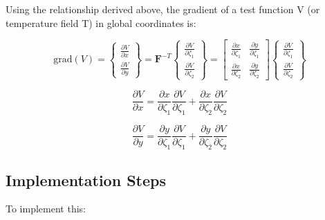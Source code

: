 \documentclass[
  11pt,
  a4paper,
]{scrbook}
\begin{document}
Using the relationship derived above, the gradient of a test function V
(or temperature field T) in global coordinates is:

\[\text{grad}(V) = \begin{Bmatrix} \frac{\partial V}{\partial x} \\ \frac{\partial V}{\partial y} \end{Bmatrix} = \mathbf{F}^{-T} \begin{Bmatrix} \frac{\partial V}{\partial \zeta_1} \\ \frac{\partial V}{\partial \zeta_2} \end{Bmatrix} = \begin{bmatrix} \frac{\partial x}{\partial \zeta_1} & \frac{\partial y}{\partial \zeta_1} \\ \frac{\partial x}{\partial \zeta_2} & \frac{\partial y}{\partial \zeta_2} \end{bmatrix} \begin{Bmatrix} \frac{\partial V}{\partial \zeta_1} \\ \frac{\partial V}{\partial \zeta_2} \end{Bmatrix}\]

\[\frac{\partial V}{\partial x} = \frac{\partial x}{\partial \zeta_1} \frac{\partial V}{\partial \zeta_1} + \frac{\partial x}{\partial \zeta_2} \frac{\partial V}{\partial \zeta_2}\]

\[\frac{\partial V}{\partial y} = \frac{\partial y}{\partial \zeta_1} \frac{\partial V}{\partial \zeta_1} + \frac{\partial y}{\partial \zeta_2} \frac{\partial V}{\partial \zeta_2}\]

\subsection{Implementation Steps}\label{implementation-steps}

To implement this:
\end{document}
